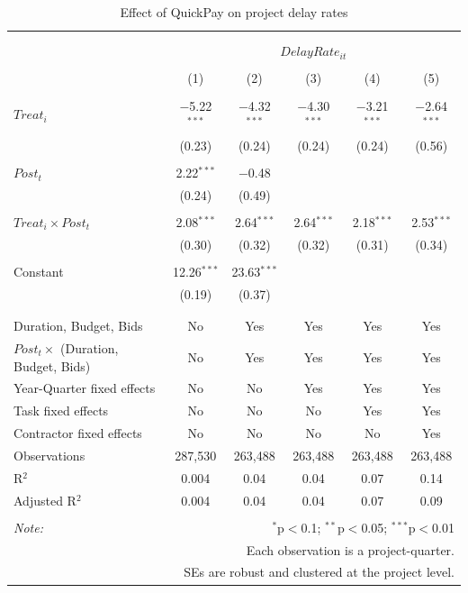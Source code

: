 \documentclass[
]{article}
\begin{document}
\begin{table}[H] \centering 
  \caption{Effect of QuickPay on project delay rates} 
  \label{} 
\small 
\begin{tabular}{@{\extracolsep{-2pt}}lccccc} 
\\[-1.8ex]\hline 
\hline \\[-1.8ex] 
\\[-1.8ex] & \multicolumn{5}{c}{$DelayRate_{it}$} \\ 
\\[-1.8ex] & (1) & (2) & (3) & (4) & (5)\\ 
\hline \\[-1.8ex] 
 $Treat_i$ & $-$5.22$^{***}$ & $-$4.32$^{***}$ & $-$4.30$^{***}$ & $-$3.21$^{***}$ & $-$2.64$^{***}$ \\ 
  & (0.23) & (0.24) & (0.24) & (0.24) & (0.56) \\ 
  & & & & & \\ 
 $Post_t$ & 2.22$^{***}$ & $-$0.48 &  &  &  \\ 
  & (0.24) & (0.49) &  &  &  \\ 
  & & & & & \\ 
 $Treat_i \times Post_t$ & 2.08$^{***}$ & 2.64$^{***}$ & 2.64$^{***}$ & 2.18$^{***}$ & 2.53$^{***}$ \\ 
  & (0.30) & (0.32) & (0.32) & (0.31) & (0.34) \\ 
  & & & & & \\ 
 Constant & 12.26$^{***}$ & 23.63$^{***}$ &  &  &  \\ 
  & (0.19) & (0.37) &  &  &  \\ 
  & & & & & \\ 
\hline \\[-1.8ex] 
Duration, Budget, Bids & No & Yes & Yes & Yes & Yes \\ 
$Post_t \times$  (Duration, Budget, Bids) & No & Yes & Yes & Yes & Yes \\ 
Year-Quarter fixed effects & No & No & Yes & Yes & Yes \\ 
Task fixed effects & No & No & No & Yes & Yes \\ 
Contractor fixed effects & No & No & No & No & Yes \\ 
Observations & 287,530 & 263,488 & 263,488 & 263,488 & 263,488 \\ 
R$^{2}$ & 0.004 & 0.04 & 0.04 & 0.07 & 0.14 \\ 
Adjusted R$^{2}$ & 0.004 & 0.04 & 0.04 & 0.07 & 0.09 \\ 
\hline 
\hline \\[-1.8ex] 
\textit{Note:}  & \multicolumn{5}{r}{$^{*}$p$<$0.1; $^{**}$p$<$0.05; $^{***}$p$<$0.01} \\ 
 & \multicolumn{5}{r}{Each observation is a project-quarter.} \\ 
 & \multicolumn{5}{r}{SEs are robust and clustered at the project level.} \\ 
\end{tabular} 
\end{table}
\end{document}
